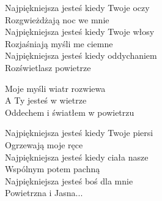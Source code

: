 \begin{text}
    Najpiękniejsza jesteś kiedy Twoje oczy\\
    Rozgwieżdżają noc we mnie\\
    Najpiękniejsza jesteś kiedy Twoje włosy\\
    Rozjaśniają myśli me ciemne\\
    Najpiękniejsza jesteś kiedy oddychaniem\\
    Rozświetlasz powietrze

    \vin Moje myśli wiatr rozwiewa\\
    \vin A Ty jesteś w wietrze\\
    \vin Oddechem i światłem w powietrzu

    Najpiękniejsza jesteś kiedy Twoje piersi\\
    Ogrzewają moje ręce\\
    Najpiękniejsza jesteś kiedy ciała nasze\\
    Wspólnym potem pachną\\
    Najpiękniejsza jesteś boś dla mnie\\
    Powietrzna i Jasna...
\end{text}
\begin{chord}

\end{chord}
